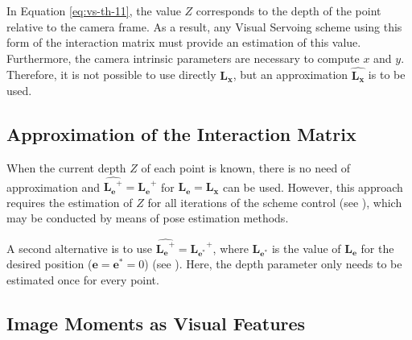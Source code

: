 In Equation \ref{eq:vs-th-11}, the value $Z$ corresponds to the depth of the point relative to the camera frame. As a result, any Visual Servoing scheme using this form of the interaction matrix must provide an estimation of this value. Furthermore, the camera intrinsic parameters are necessary to compute $x$ and $y$. Therefore, it is not possible to use directly $\bm{L_x}$, but an approximation $\widehat{\bm{L_x}}$ is to be used.

\subsection*{Approximation of the Interaction Matrix}

When the current depth $Z$ of each point is known, there is no need of approximation and $\widehat{\bm{L_e}^+} = \bm{L_e}^+$ for $\bm{L_e} = \bm{L_x}$ can be used. However, this approach requires the estimation of $Z$ for all iterations of the scheme control (see \cite{hutchinson_1996}), which may be conducted by means of pose estimation methods.

A second alternative is to use $\widehat{\bm{L_e}^+} = \bm{L_{e^\ast}}^+$, where $\bm{L_{e^\ast}}$ is the value of $\bm{L_{e}}$ for the desired position ($\bm{e} = \bm{e}^\ast = 0$) (see \cite{espiau_1992}). Here, the depth parameter only needs to be estimated once for every point.

%
%
%
  
\subsection{Image Moments as Visual Features}
\label{sec:image-moments}

